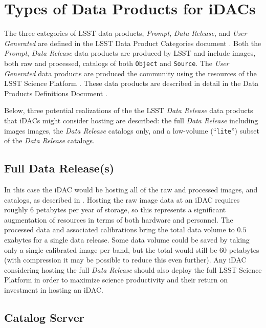 \section{Types of Data Products for iDACs}\label{sec:data}
 
The three categories of LSST data products, {\it Prompt}, {\it Data Release}, and {\it User Generated} are defined in the LSST Data Product Categories document  . 
Both the {\it Prompt}, {\it Data Release} data products are produced by LSST and include images, both raw and processed, catalogs of both {\tt Object} and {\tt Source}. 
The  {\it User Generated} data products are produced the community using the resources of the LSST Science Platform . 
These data products are described in detail in the Data Products Definitions Document . 

Below, three potential realizations of the the LSST {\it Data Release} data products that iDACs might consider hosting are described: the full {\it Data Release} including images images, the {\it Data Release} catalogs only, and a low-volume (``{\tt lite}'') subset of the {\it Data Release} catalogs.

\subsection{Full Data Release(s)}

In this case the iDAC would be hosting all of the raw and processed images, and catalogs, as described in . Hosting the raw image data at an iDAC requires roughly $6$ petabytes per year of storage, so this represents a significant augmentation of resources in terms of both hardware and personnel. The processed data and associated calibrations bring the total data volume to $0.5$ exabytes for a single data release. Some data volume could be saved by taking only a single calibrated image per band, but the total would still be $60$ petabytes (with compression it may be possible to reduce this even further). Any iDAC considering hosting the full {\it Data Release} should also deploy the full LSST Science Platform  in order to maximize science productivity and their return on investment in hosting an iDAC.

\subsection{Catalog Server}	

